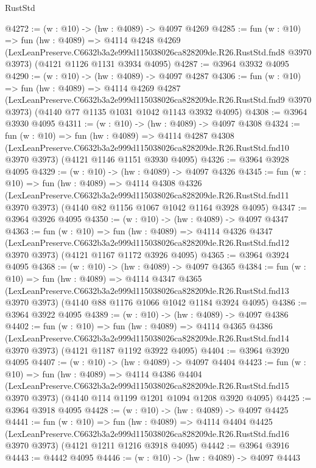 \begin{lexlean}{RustStd}
\begin{coremodule}
@4272 := (w : @10) -> (hw : @4089) -> @4097 @4269
@4285 := fun (w : @10) =>
  fun (hw : @4089) =>
  @4114
    @4248
    @4269
    (LexLeanPreserve.C6632b3a2e999d115038026ca828209de.R26.RustStd.fnd8 @3970 @3973)
    (@4121 @1126 @1131 @3934 @4095)
@4287 := @3964 @3932 @4095
@4290 := (w : @10) -> (hw : @4089) -> @4097 @4287
@4306 := fun (w : @10) =>
  fun (hw : @4089) =>
  @4114
    @4269
    @4287
    (LexLeanPreserve.C6632b3a2e999d115038026ca828209de.R26.RustStd.fnd9 @3970 @3973)
    (@4140 @77 @1135 @1031 @1042 @1143 @3932 @4095)
@4308 := @3964 @3930 @4095
@4311 := (w : @10) -> (hw : @4089) -> @4097 @4308
@4324 := fun (w : @10) =>
  fun (hw : @4089) =>
  @4114
    @4287
    @4308
    (LexLeanPreserve.C6632b3a2e999d115038026ca828209de.R26.RustStd.fnd10 @3970 @3973)
    (@4121 @1146 @1151 @3930 @4095)
@4326 := @3964 @3928 @4095
@4329 := (w : @10) -> (hw : @4089) -> @4097 @4326
@4345 := fun (w : @10) =>
  fun (hw : @4089) =>
  @4114
    @4308
    @4326
    (LexLeanPreserve.C6632b3a2e999d115038026ca828209de.R26.RustStd.fnd11 @3970 @3973)
    (@4140 @82 @1156 @1067 @1042 @1164 @3928 @4095)
@4347 := @3964 @3926 @4095
@4350 := (w : @10) -> (hw : @4089) -> @4097 @4347
@4363 := fun (w : @10) =>
  fun (hw : @4089) =>
  @4114
    @4326
    @4347
    (LexLeanPreserve.C6632b3a2e999d115038026ca828209de.R26.RustStd.fnd12 @3970 @3973)
    (@4121 @1167 @1172 @3926 @4095)
@4365 := @3964 @3924 @4095
@4368 := (w : @10) -> (hw : @4089) -> @4097 @4365
@4384 := fun (w : @10) =>
  fun (hw : @4089) =>
  @4114
    @4347
    @4365
    (LexLeanPreserve.C6632b3a2e999d115038026ca828209de.R26.RustStd.fnd13 @3970 @3973)
    (@4140 @88 @1176 @1066 @1042 @1184 @3924 @4095)
@4386 := @3964 @3922 @4095
@4389 := (w : @10) -> (hw : @4089) -> @4097 @4386
@4402 := fun (w : @10) =>
  fun (hw : @4089) =>
  @4114
    @4365
    @4386
    (LexLeanPreserve.C6632b3a2e999d115038026ca828209de.R26.RustStd.fnd14 @3970 @3973)
    (@4121 @1187 @1192 @3922 @4095)
@4404 := @3964 @3920 @4095
@4407 := (w : @10) -> (hw : @4089) -> @4097 @4404
@4423 := fun (w : @10) =>
  fun (hw : @4089) =>
  @4114
    @4386
    @4404
    (LexLeanPreserve.C6632b3a2e999d115038026ca828209de.R26.RustStd.fnd15 @3970 @3973)
    (@4140 @114 @1199 @1201 @1094 @1208 @3920 @4095)
@4425 := @3964 @3918 @4095
@4428 := (w : @10) -> (hw : @4089) -> @4097 @4425
@4441 := fun (w : @10) =>
  fun (hw : @4089) =>
  @4114
    @4404
    @4425
    (LexLeanPreserve.C6632b3a2e999d115038026ca828209de.R26.RustStd.fnd16 @3970 @3973)
    (@4121 @1211 @1216 @3918 @4095)
@4442 := @3964 @3916
@4443 := @4442 @4095
@4446 := (w : @10) -> (hw : @4089) -> @4097 @4443

\end{coremodule}
\end{lexlean}
